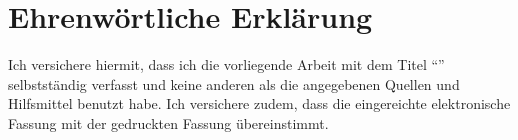 \clearpage
\chapter*{Ehrenwörtliche Erklärung}


Ich versichere hiermit, dass ich die vorliegende Arbeit mit dem Titel ``\textit{\DerTitelDerArbeit}'' selbstständig verfasst und
keine anderen als die angegebenen Quellen und Hilfsmittel benutzt habe. Ich versichere zudem, dass die eingereichte elektronische
Fassung mit der gedruckten Fassung übereinstimmt.

\vspace{3cm}
\hfill \DerAutorDerArbeit
